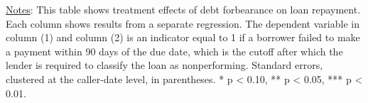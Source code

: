 \begin{landscape}
\begin{table}[ht!]
\begin{center}
{		\label{tab:default_table}}
		
		\end{center}
		\underline{Notes}: This table shows treatment effects of debt forbearance on loan repayment. Each column shows results from a separate regression. The dependent variable in column (1) and column (2) is an indicator equal to 1 if a borrower failed to make a payment within 90 days of the due date, which is the cutoff after which the lender is required to classify the loan as nonperforming. Standard errors, clustered at the caller-date level, in parentheses. * p < 0.10, ** p < 0.05, *** p < 0.01.
	\end{table}

\end{landscape}